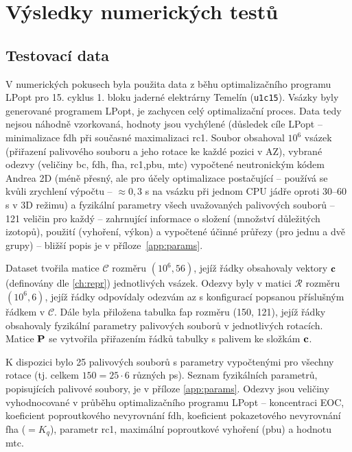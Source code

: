 \chapter{Výsledky numerických testů}

\section{Testovací data}
V numerických pokusech byla použita data z běhu optimalizačního programu LPopt pro 15. cyklus 1. bloku jaderné elektrárny Temelín (\verb|u1c15|). 
Vsázky byly generované programem LPopt, je zachycen celý optimalizační proces. Data tedy nejsou náhodně vzorkovaná, hodnoty jsou vychýlené 
(důsledek cíle LPopt -- minimalizace \ac{fdh} při současné maximalizaci \ac{rc1}. Soubor obsahoval 
$10^6$ vsázek (přiřazení palivového souboru a jeho rotace ke každé pozici v AZ), vybrané odezvy 
(veličiny \ac{bc}, \ac{fdh}, \ac{fha}, \ac{rc1},\ac{pbu}, \ac{mtc}) 
vypočtené neutronickým kódem Andrea 2D (méně přesný, ale pro účely optimalizace postačující --  používá se kvůli zrychlení výpočtu -- $\approx 0,3$ s na 
vsázku při jednom CPU jádře oproti 30--60 s v 3D režimu) a fyzikální parametry všech uvažovaných palivových souborů -- 121 veličin 
pro každý -- zahrnující informace 
o složení (množství důležitých izotopů), použití (vyhoření, výkon) a vypočtené účinné průřezy (pro jednu a dvě grupy) -- bližší popis je 
v příloze~\ref{app:params}.

Dataset tvořila matice $\mathcal{C}$ rozměru $(10^6, 56)$, jejíž řádky obsahovaly vektory $\mathbf{c}$ (definovány dle \ref{ch:repr}) jednotlivých 
vsázek. Odezvy byly v matici $\mathcal{R}$ rozměru $(10^6, 6)$, jejíž řádky odpovídaly odezvám \ac{az} s konfigurací popsanou příslušným 
řádkem v $\mathcal{C}$. 
Dále byla přiložena tabulka \ac{fap} rozměru (150, 121), jejíž řádky obsahovaly fyzikální parametry palivových souborů v jednotlivých rotacích. 
Matice $\mathbf{P}$ se vytvořila přiřazením řádků tabulky s palivem ke složkám $\mathbf{c}$.

K dispozici bylo 25 palivových souborů s parametry vypočtenými pro všechny rotace (tj. celkem $150 = 25\cdot6$ různých \ac{ps}). Seznam 
fyzikálních parametrů, popisujících palivové soubory, 
je v příloze \ref{app:params}. 
Odezvy jsou veličiny vyhodnocované 
v průběhu optimalizačního programu LPopt -- koncentraci  EOC, koeficient poproutkového nevyrovnání \ac{fdh}, 
koeficient pokazetového nevyrovnání \ac{fha} ($=K_q$), parametr \ac{rc1}, maximální poproutkové vyhoření (\ac{pbu}) a hodnotu \ac{mtc}.

